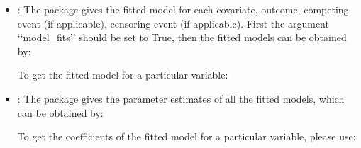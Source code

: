 \documentclass[letterpaper,10pt,english]{sphinxmanual}
\begin{document}
\begin{itemize}
\item {} 
\sphinxAtStartPar
{}: The package gives the fitted model for each covariate, outcome, competing event (if applicable), censoring event (if applicable).
First the argument ‘‘model\_fits’’ should be set to True, then the fitted models can be obtained by:
\begin{quote}

\begin{sphinxVerbatim}[commandchars=\\\{\}]
  \PYG{p}{[}\PYG{p}{]}
\end{sphinxVerbatim}
\end{quote}

\sphinxAtStartPar
To get the fitted model for a particular variable:
\begin{quote}

\begin{sphinxVerbatim}[commandchars=\\\{\}]
  \PYG{p}{[}\PYG{p}{]}\PYG{p}{[}\PYG{p}{]}
\end{sphinxVerbatim}
\end{quote}

\item {} 
\sphinxAtStartPar
{}: The package gives the parameter estimates of all the fitted models, which can be obtained by:
\begin{quote}

\begin{sphinxVerbatim}[commandchars=\\\{\}]
  \PYG{p}{[}\PYG{p}{]}
\end{sphinxVerbatim}
\end{quote}

\sphinxAtStartPar
To get the coefficients of the fitted model for a particular variable, please use:
\begin{quote}

\begin{sphinxVerbatim}[commandchars=\\\{\}]
  \PYG{p}{[}\PYG{p}{]}\PYG{p}{[}\PYG{p}{]}
\end{sphinxVerbatim}
\end{quote}


\end{itemize}
\end{document}
